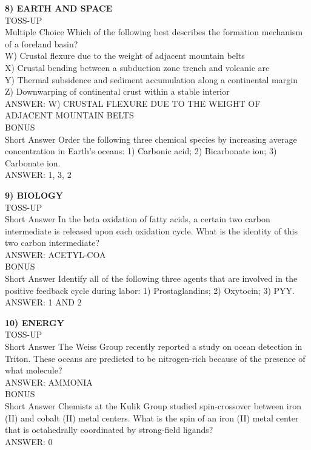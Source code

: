 \documentclass{article}
\begin{document}
\noindent \textbf{8) EARTH AND SPACE} \\
TOSS-UP \\
Multiple Choice Which of the following best describes the formation mechanism of a foreland basin? \\
W) Crustal flexure due to the weight of adjacent mountain belts \\
X) Crustal bending between a subduction zone trench and volcanic arc \\
Y) Thermal subsidence and sediment accumulation along a continental margin \\
Z) Downwarping of continental crust within a stable interior \\
ANSWER: W) CRUSTAL FLEXURE DUE TO THE WEIGHT OF ADJACENT MOUNTAIN BELTS \\
BONUS \\
Short Answer Order the following three chemical species by increasing average concentration in Earth's oceans: 1) Carbonic acid; 2) Bicarbonate ion; 3) Carbonate ion. \\
ANSWER: 1, 3, 2

\noindent \textbf{9) BIOLOGY} \\
TOSS-UP \\
Short Answer In the beta oxidation of fatty acids, a certain two carbon intermediate is released upon each oxidation cycle. What is the identity of this two carbon intermediate? \\
ANSWER: ACETYL-COA \\
BONUS \\
Short Answer Identify all of the following three agents that are involved in the positive feedback cycle during labor: 1) Prostaglandins; 2) Oxytocin; 3) PYY. \\
ANSWER: 1 AND 2

\noindent \textbf{10) ENERGY} \\
TOSS-UP \\
Short Answer The Weiss Group recently reported a study on ocean detection in Triton. These oceans are predicted to be nitrogen-rich because of the presence of what molecule? \\
ANSWER: AMMONIA \\
BONUS \\
Short Answer Chemists at the Kulik Group studied spin-crossover between iron (II) and cobalt (II) metal centers. What is the spin of an iron (II) metal center that is octahedrally coordinated by strong-field ligands? \\
ANSWER: 0
\end{document}
